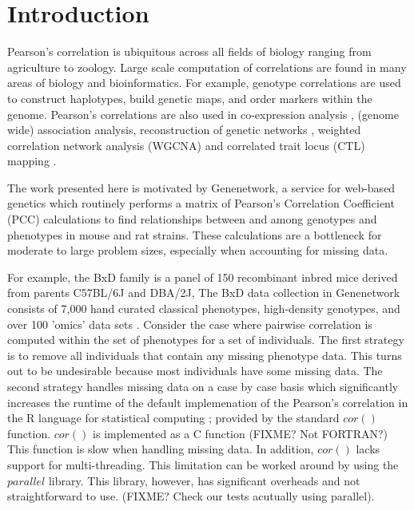 \documentclass{bioinfo}
\begin{document}
\maketitle


\section{Introduction}

Pearson's correlation is ubiquitous across all fields of biology
ranging from agriculture to zoology. Large scale computation of
correlations are found in many areas of biology and bioinformatics.
For example, genotype correlations are used to construct haplotypes,
build genetic maps, and order markers within the genome. Pearson's
correlations are also used in co-expression analysis \citep{Tesson:2010},
(genome wide) association analysis, reconstruction of genetic
networks \citep{Fukushima:2013}, weighted correlation network analysis
(WGCNA) \citep{Horvath:2008} and correlated trait locus (CTL)
mapping \citep{Arends2016a}.



\enlargethispage{12pt}

The work presented here is motivated by Genenetwork, a service for
web-based genetics \citep{Sloan2016} which routinely performs a matrix
of Pearson's Correlation Coefficient (PCC) calculations to find
relationships between and among genotypes and phenotypes in mouse and
rat strains. These calculations are a bottleneck for moderate to large
problem sizes, especially when accounting for missing data.

For example, the BxD family is a panel of 150 recombinant inbred mice
derived from parents C57BL/6J and DBA/2J, The BxD data collection in
Genenetwork consists of 7,000 hand curated classical phenotypes,
high-density genotypes, and over 100 'omics' data
sets \citep{Ashbrook:2019}.  Consider the case where pairwise
correlation is computed within the set of phenotypes for a set of
individuals. The first strategy is to remove all individuals that
contain any missing phenotype data. This turns out to be undesirable
because most individuals have some missing data. The second strategy
handles missing data on a case by case basis which significantly
increases the runtime of the default implemenation of the Pearson's
correlation in the R language for statistical
computing \citep{R:2005}; provided by the standard $cor()$
function. $cor()$ is implemented as a C function (FIXME? Not FORTRAN?)
This function is slow when handling missing data.  In addition,
$cor()$ lacks support for multi-threading. This limitation can be
worked around by using the $parallel$ library. This library, however,
has significant overheads and not straightforward to use. (FIXME?
Check our tests acutually using parallel).
\end{document}
